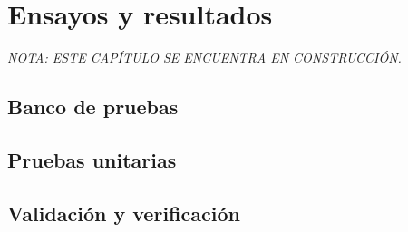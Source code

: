 
\chapter{Ensayos y resultados} %

\label{Chapter4} %


\textit{ NOTA: ESTE CAPÍTULO SE ENCUENTRA EN CONSTRUCCIÓN.}

\section{Banco de pruebas}
\label{sec:bancoPruebas}


\section{Pruebas unitarias}
\label{sec:pruebasUnitarias}

\section{Validación y verificación}
\label{sec:validacionVerificacion}